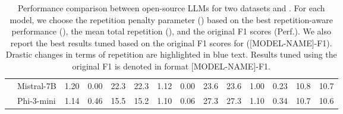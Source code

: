 \begin{table}[t]
{\begin{tabular}{l|l|rrrr|rrrr|rrrr}
                           & Mistral-7B         & 1.20                    & 0.00                    & 22.3                    & 22.3                   & 1.12                    & 0.00                    & 23.6                    & 23.6                   & 1.00                    & 0.23                    & 10.8                    & 10.7                  \\
                           & Phi-3-mini         & 1.14                    & 0.46                    & 15.5                    & 15.2                   & 1.10                    & 0.06                    & 27.3                    & 27.3                   & 1.10                    & 0.34                    & 10.7                    & 10.6                  \\ \bottomrule
\end{tabular}}
\caption{Performance comparison between open-source LLMs for two datasets \webqsp and \ms. 
For each model, we choose the repetition penalty parameter (\rp) based on the best repetition-aware performance (\rap), the mean total repetition (\mtr), and the original F1 scores (Perf.). We also report the best results tuned based on the original F1 scores for \webqsp ([MODEL-NAME]-F1). Drastic changes in terms of repetition are highlighted in blue text. Results tuned using the original F1 is denoted in format [MODEL-NAME]-F1.}
\label{tab:best_rpp}
\end{table}